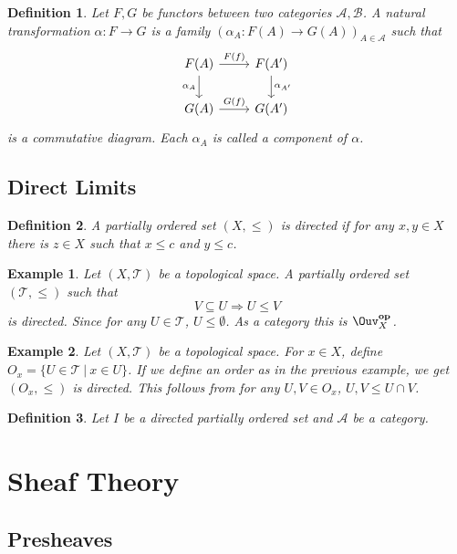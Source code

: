 \documentclass{article}
\newtheorem{definition}{Definition}[section]
\newtheorem{example}{Example}[section]
\numberwithin{equation}{section}
\begin{document}
\begin{definition}
Let $F,G$ be functors between two categories $\mathcal{A},\mathcal{B}$. A natural transformation $\alpha:F\to G$ is a family $(\alpha_A:F(A)\to G(A))_{A\in\mathcal{A}}$ such that 
\[ \begin{tikzcd}
F(A) \arrow{r}{F(f)} \arrow[swap]{d}{\alpha_A} & F(A') \arrow{d}{\alpha_{A'}} \\%
G(A) \arrow{r}{G(f)}& G(A')
\end{tikzcd}
\]
is a commutative diagram. Each $\alpha_A$ is called a component of $\alpha$. 
 \label{natural_transformation}
\end{definition}

\subsection{Direct Limits}

\begin{definition}
A partially ordered set $(X,\leq)$ is directed if for any $x,y\in X$ there is $z\in X$ such that $x\leq c$ and $y\leq c$.
\end{definition}

\begin{example}
Let $(X,\mathcal{T})$ be a topological space. A partially ordered set $(\mathcal{T},\leq)$ such that 
\begin{equation*}
V\subseteq U\Rightarrow U\leq V
\end{equation*}
is directed. Since for any $U\in\mathcal{T}$, $U\leq \emptyset$. As a category this is $\Ouv_X^{\mathbf{op}}$.
\end{example}

\begin{example}
Let $(X,\mathcal{T})$ be a topological space. For $x\in X$, define$O_x = \{U\in\mathcal{T}\:|\: x\in U\}$. If we define an order as in the previous example, we get $(O_x,\leq)$ is directed. This follows from for any $U,V\in O_x$, $U,V\leq U\cap V$.  
\end{example}

\begin{definition}
Let $I$ be a directed partially ordered set and $\mathcal{A}$ be a category. 
\end{definition}

\section{Sheaf Theory}

\subsection{Presheaves}
\end{document}
